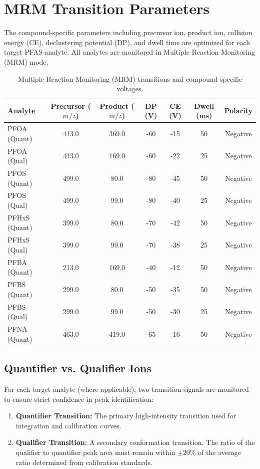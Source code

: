 \section{MRM Transition Parameters}
The compound-specific parameters including precursor ion, product ion, collision energy (CE), declustering potential (DP), and dwell time are optimized for each target PFAS analyte. All analytes are monitored in Multiple Reaction Monitoring (MRM) mode.

\begin{table}[h]
\centering
\begin{tabularx}{\textwidth}{l c c c c c c}
    \toprule
    \textbf{Analyte} & \textbf{Precursor ($m/z$)} & \textbf{Product ($m/z$)} & \textbf{DP (V)} & \textbf{CE (V)} & \textbf{Dwell (ms)} & \textbf{Polarity} \\
    \midrule
    PFOA (Quant) & 413.0 & 369.0 & -60 & -15 & 50 & Negative \\
    PFOA (Qual)  & 413.0 & 169.0 & -60 & -22 & 25 & Negative \\
    PFOS (Quant) & 499.0 & 80.0  & -80 & -45 & 50 & Negative \\
    PFOS (Qual)  & 499.0 & 99.0  & -80 & -40 & 25 & Negative \\
    PFHxS (Quant) & 399.0 & 80.0  & -70 & -42 & 50 & Negative \\
    PFHxS (Qual)  & 399.0 & 99.0  & -70 & -38 & 25 & Negative \\
    PFBA (Quant) & 213.0 & 169.0 & -40 & -12 & 50 & Negative \\
    PFBS (Quant) & 299.0 & 80.0  & -50 & -35 & 50 & Negative \\
    PFBS (Qual)  & 299.0 & 99.0  & -50 & -30 & 25 & Negative \\
    PFNA (Quant) & 463.0 & 419.0 & -65 & -16 & 50 & Negative \\
    \bottomrule
\end{tabularx}
\caption{Multiple Reaction Monitoring (MRM) transitions and compound-specific voltages.}
\end{table}

\subsection{Quantifier vs. Qualifier Ions}
For each target analyte (where applicable), two transition signals are monitored to ensure strict confidence in peak identification:
\begin{enumerate}
    \item \textbf{Quantifier Transition:} The primary high-intensity transition used for integration and calibration curves.
    \item \textbf{Qualifier Transition:} A secondary conformation transition. The ratio of the qualifier to quantifier peak area must remain within $\pm 20\%$ of the average ratio determined from calibration standards.
\end{enumerate}
